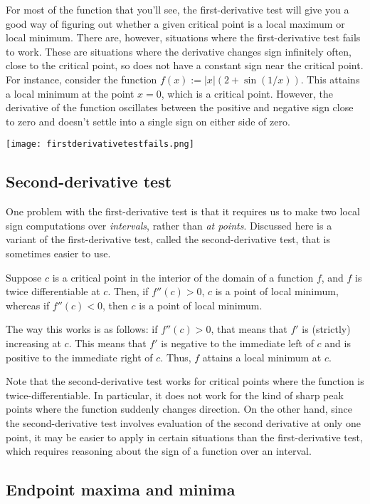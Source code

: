 \documentclass[10pt]{amsart}
\begin{document}
For most of the function that you'll see, the first-derivative test
will give you a good way of figuring out whether a given critical
point is a local maximum or local minimum. There are, however,
situations where the first-derivative test fails to work. These are
situations where the derivative changes sign infinitely often, close
to the critical point, so does not have a constant sign near the
critical point. For instance, consider the function $f(x) := |x| (2 +
\sin(1/x))$. This attains a local minimum at the point $x = 0$, which
is a critical point. However, the derivative of the function
oscillates between the positive and negative sign close to zero and
doesn't settle into a single sign on either side of zero.

\texttt{[image: firstderivativetestfails.png]}

\subsection{Second-derivative test}

One problem with the first-derivative test is that it requires us to
make two local sign computations over {\em intervals}, rather than
{\em at points}. Discussed here is a variant of the first-derivative
test, called the second-derivative test, that is sometimes easier to
use.

Suppose $c$ is a critical point in the interior of the domain of a
function $f$, and $f$ is twice differentiable at $c$. Then, if $f''(c)
> 0$, $c$ is a point of local minimum, whereas if $f''(c) < 0$, then
$c$ is a point of local minimum.

The way this works is as follows: if $f''(c) > 0$, that means that
$f'$ is (strictly) increasing at $c$. This means that $f'$ is negative
to the immediate left of $c$ and is positive to the immediate right of
$c$. Thus, $f$ attains a local minimum at $c$.

Note that the second-derivative test works for critical points where
the function is twice-differentiable. In particular, it does not work
for the kind of sharp peak points where the function suddenly changes
direction. On the other hand, since the second-derivative test
involves evaluation of the second derivative at only one point, it may
be easier to apply in certain situations than the first-derivative
test, which requires reasoning about the sign of a function over an
interval.

\subsection{Endpoint maxima and minima}
\end{document}
